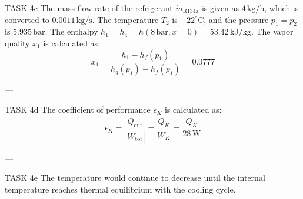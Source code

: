 TASK 4c  
The mass flow rate of the refrigerant \( \dot{m}_{\text{R134a}} \) is given as \( 4 \, \text{kg/h} \), which is converted to \( 0.0011 \, \text{kg/s} \).  
The temperature \( T_2 \) is \( -22^\circ\text{C} \), and the pressure \( p_1 = p_2 \) is \( 5.935 \, \text{bar} \).  
The enthalpy \( h_1 = h_4 = h(8 \, \text{bar}, x = 0) = 53.42 \, \text{kJ/kg} \).  
The vapor quality \( x_1 \) is calculated as:  
\[
x_1 = \frac{h_1 - h_f(p_1)}{h_g(p_1) - h_f(p_1)} = 0.0777
\]

---

TASK 4d  
The coefficient of performance \( \epsilon_K \) is calculated as:  
\[
\epsilon_K = \frac{\dot{Q}_{\text{out}}}{|\dot{W}_{\text{tot}}|} = \frac{\dot{Q}_K}{\dot{W}_K} = \frac{\dot{Q}_K}{28 \, \text{W}}
\]

---

TASK 4e  
The temperature would continue to decrease until the internal temperature reaches thermal equilibrium with the cooling cycle.  
